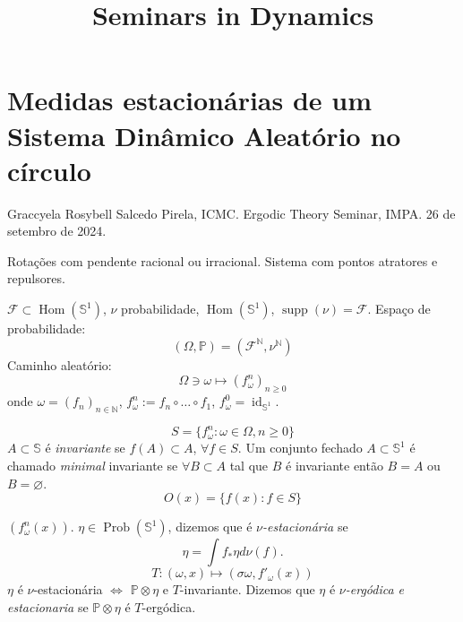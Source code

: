 



\title{Seminars in Dynamics}
\maketitle

\label{section-phantom}

\tableofcontents



\section{Medidas estacionárias de um Sistema
Dinâmico Aleatório no círculo}
\label{section-medidas-estacionarias-circulo}

\noindent
Graccyela Rosybell Salcedo Pirela, ICMC.
Ergodic Theory Seminar, IMPA.
26 de setembro de 2024.

\medskip{}
Rotações  com pendente racional ou
irracional. Sistema com pontos atratores e
repulsores.

\medskip{}
$\mathcal{F}\subset
\operatorname{Hom}(\mathbb{S}^1)$,
$\nu$ probabilidade,
$\operatorname{Hom}(\mathbb{S}^1)$,
$\operatorname{supp}(\nu)=\mathcal{F}$.
Espaço de probabilidade:
$$
(\Omega,\mathbb{P})=
(\mathcal{F}^{\mathbb{N}},\nu^{\mathbb{N}})
$$
Caminho aleatório:
$$
\Omega \ni \omega\longmapsto
(f^n_\omega)_{n\geq 0}
$$
onde $\omega=(f_n)_{ n \in \mathbb{N}}$,
$f_{\omega}^n:=f_n\circ \ldots \circ f_1$,
$f^0_\omega =
\operatorname{id}_{\mathbb{S}^1}$.

\medskip{}
$$
S=\{f^n_{\omega}:\omega \in\Omega,n \geq 0\}
$$
$A\subset \mathbb{S}$ é
\textit{invariante} se
$f(A)\subset A$, $\forall f\in S$.
Um conjunto fechado
$A\subset \mathbb{S}^1$ é chamado
\textit{minimal} invariante se
$\forall B\subset A$ tal que $B$ é
invariante então $B=A$ ou  $B=\varnothing $.
$$
O(x)=\{f(x):f\in S\}
$$

\medskip{}
$(f^n_\omega(x))$.
$\eta\in\operatorname{Prob}(\mathbb{S}^1)$,
dizemos que é  \textit{$\nu$-estacionária} se
$$
\eta=\int f_*\eta d\nu(f).
$$
$$
T:(\omega,x)\longmapsto
(\sigma\omega,f'_\omega(x))
$$
$\eta$ é $\nu$-estacionária  $\iff$
$\mathbb{P}\otimes \eta$ e $T$-invariante.
Dizemos que $\eta$ é
\textit{$\nu$-ergódica e estacionaria} se
$\mathbb{P}\otimes \eta$ é $T$-ergódica.


